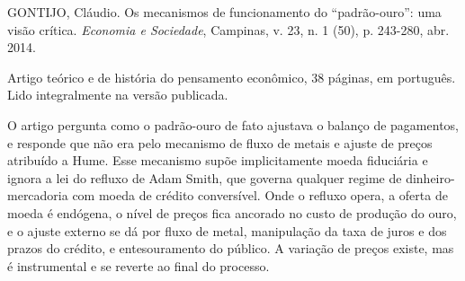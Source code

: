 
\begin{identificacao}
GONTIJO, Cláudio. Os mecanismos de funcionamento do ``padrão-ouro'': uma visão
crítica. \emph{Economia e Sociedade}, Campinas, v. 23, n. 1 (50), p. 243-280,
abr. 2014.

Artigo teórico e de história do pensamento econômico, 38 páginas, em português.
Lido integralmente na versão publicada.
\end{identificacao}

O artigo pergunta como o padrão-ouro de fato ajustava o balanço de pagamentos, e
responde que não era pelo mecanismo de fluxo de metais e ajuste de preços
atribuído a Hume. Esse mecanismo supõe implicitamente moeda fiduciária e ignora a
lei do refluxo de Adam Smith, que governa qualquer regime de dinheiro-mercadoria
com moeda de crédito conversível. Onde o refluxo opera, a oferta de moeda é
endógena, o nível de preços fica ancorado no custo de produção do ouro, e o
ajuste externo se dá por fluxo de metal, manipulação da taxa de juros e dos
prazos do crédito, e entesouramento do público. A variação de preços existe, mas
é instrumental e se reverte ao final do processo.

